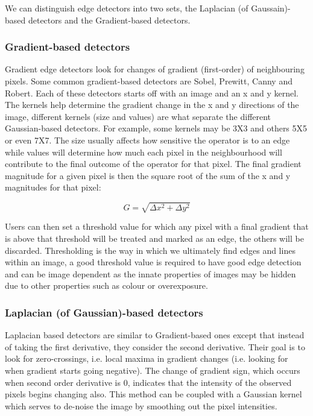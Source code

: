 \documentclass[11pt]{article}
\begin{document}
We can distinguish edge detectors into two sets, the Laplacian (of 
Gaussain)-based detectors and the Gradient-based detectors.

\subsubsection{Gradient-based detectors}
Gradient edge detectors look for changes of gradient (first-order) of 
neighbouring pixels. Some common gradient-based detectors are Sobel,
Prewitt, Canny and Robert. Each of these detectors starts off with an image
and an x and y kernel. The kernels help determine the gradient change in the x
and y directions of the image, different kernels (size and values) are what
separate the different Gaussian-based detectors. For example, some kernels
may be 3X3 and others 5X5 or even 7X7. The size usually affects how
sensitive the operator is to an edge while values will determine how much
each pixel in the neighbourhood will contribute to the final outcome
of the operator for that pixel. The final gradient magnitude
for a given pixel is then the square root of the sum of the x and y
magnitudes for that pixel: 

\begin{equation}
	G = \sqrt{\Delta x^2 + \Delta y^2} 
\end{equation}

Users can then set a threshold value for which any pixel with a final
gradient that is above that threshold will be treated and marked as an edge,
the others will be discarded. Thresholding is the way in which we 
ultimately find edges and lines within an image, a good threshold value is
required to have good edge detection and can be image dependent as
the innate properties of images may be hidden due to other properties such
as colour or overexposure.

\subsubsection{Laplacian (of Gaussian)-based detectors}
Laplacian based detectors are similar to Gradient-based ones except that 
instead of taking the first derivative, they consider the second derivative.
Their goal is to look for zero-crossings, i.e. local maxima in 
gradient changes (i.e. looking for when gradient starts going negative). The
change of gradient sign, which occurs when second order derivative is 0,
indicates that the intensity of the observed pixels begins changing also. This
method can be coupled with a Gaussian kernel which serves to de-noise the
image by smoothing out the pixel intensities. 
\end{document}
